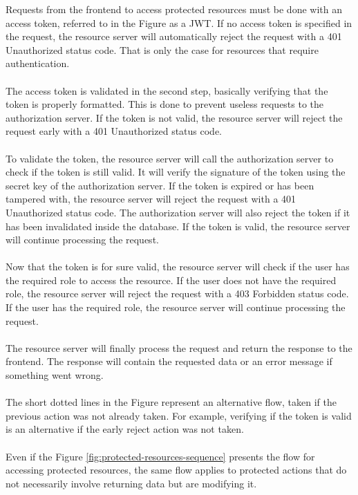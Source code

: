 \noindent Requests from the frontend to access protected resources must be done with an access token, referred to in the Figure as a JWT. If no access token is specified in the request, the resource server will automatically reject the request with a 401 Unauthorized status code. That is only the case for resources that require authentication.
\\\\
\noindent The access token is validated in the second step, basically verifying that the token is properly formatted. This is done to prevent useless requests to the authorization server. If the token is not valid, the resource server will reject the request early with a 401 Unauthorized status code.
\\\\
\noindent To validate the token, the resource server will call the authorization server to check if the token is still valid. It will verify the signature of the token using the secret key of the authorization server. If the token is expired or has been tampered with, the resource server will reject the request with a 401 Unauthorized status code. The authorization server will also reject the token if it has been invalidated inside the database. If the token is valid, the resource server will continue processing the request.
\\\\
\noindent Now that the token is for sure valid, the resource server will check if the user has the required role to access the resource. If the user does not have the required role, the resource server will reject the request with a 403 Forbidden status code. If the user has the required role, the resource server will continue processing the request.
\\\\
\noindent The resource server will finally process the request and return the response to the frontend. The response will contain the requested data or an error message if something went wrong.
\\\\
\noindent The short dotted lines in the Figure represent an alternative flow, taken if the previous action was not already taken. For example, verifying if the token is valid is an alternative if the early reject action was not taken.
\\\\
\noindent Even if the Figure \ref{fig:protected-resources-sequence} presents the flow for accessing protected resources, the same flow applies to protected actions that do not necessarily involve returning data but are modifying it.